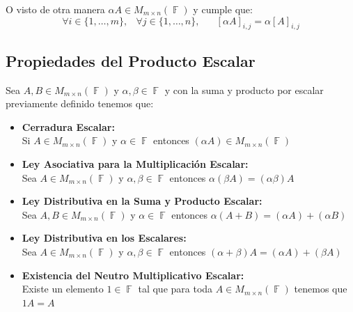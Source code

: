 \documentclass[12pt, fleqn]{report}                             %
\DeclareMathOperator \Space     {\quad}                         %
\DeclareMathOperator \MiniSpace {\;}                            %
\theoremstyle{break}                                            %
\DeclareMathOperator \GenericField {\mathbb{F}}                 %
\begin{document}
            O visto de otra manera $\alpha A \in M_{m \times n}(\GenericField)$ y cumple que:
            \begin{equation}
                \forall i \in \{1, \dots, m\} ,\MiniSpace
                    \forall j \in \{1, \dots, n\} ,\Space
                        [\alpha A]_{i, j} = \alpha [A]_{i, j}
            \end{equation}

            \subsection{Propiedades del Producto Escalar}

                Sea $A, B \in M_{m \times n}(\GenericField)$ y $\alpha, \beta \in \GenericField$
                y con la suma y producto por escalar previamente definido tenemos que:

                \begin{itemize}

                    \item \textbf{Cerradura Escalar:}\\
                        Si $A\in M_{m \times n}(\GenericField)$ y $\alpha \in \GenericField$ entonces 
                        $(\alpha A) \in M_{m \times n}(\GenericField)$

                    \item \textbf{Ley Asociativa para la Multiplicación Escalar:}\\
                        Sea $A \in M_{m \times n}(\GenericField)$ y $\alpha, \beta \in \GenericField$
                        entonces $\alpha(\beta A) = (\alpha \beta)A$

                    \item \textbf{Ley Distributiva en la Suma y Producto Escalar:}\\
                        Sea $A, B \in M_{m \times n}(\GenericField)$ y $\alpha \in \GenericField$
                        entonces $\alpha(A + B) = (\alpha A) + (\alpha B)$

                    \item \textbf{Ley Distributiva en los Escalares:}\\
                        Sea $A \in M_{m \times n}(\GenericField)$ y $\alpha, \beta \in \GenericField$
                        entonces $(\alpha + \beta)A = (\alpha A) + (\beta A)$

                    \item \textbf{Existencia del Neutro Multiplicativo Escalar:}\\
                        Existe un elemento $1 \in \GenericField$ tal que para toda
                            $A \in M_{m \times n}(\GenericField)$ tenemos que $1A = A$

                \end{itemize}
\end{document}
